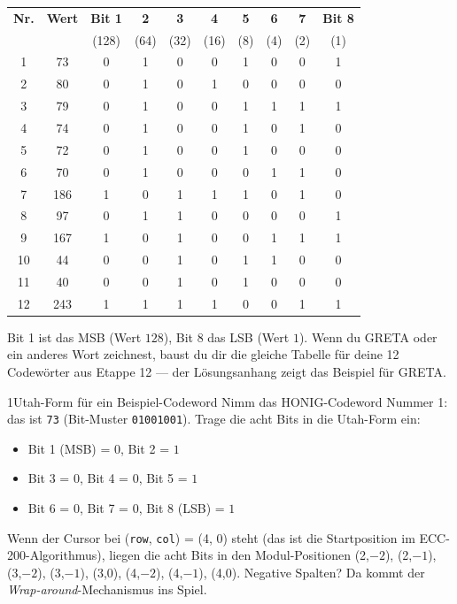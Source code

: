 \begin{center}
\small
\begin{tabular}{c c | c c c c c c c c}
\toprule
\textbf{Nr.} & \textbf{Wert} & \textbf{Bit 1} & \textbf{2} & \textbf{3} & \textbf{4} & \textbf{5} & \textbf{6} & \textbf{7} & \textbf{Bit 8} \\
                &           & (128) & (64) & (32) & (16) & (8) & (4) & (2) & (1) \\
\midrule
\phantom{0}1  &  73 & 0 & 1 & 0 & 0 & 1 & 0 & 0 & 1 \\
\phantom{0}2  &  80 & 0 & 1 & 0 & 1 & 0 & 0 & 0 & 0 \\
\phantom{0}3  &  79 & 0 & 1 & 0 & 0 & 1 & 1 & 1 & 1 \\
\phantom{0}4  &  74 & 0 & 1 & 0 & 0 & 1 & 0 & 1 & 0 \\
\phantom{0}5  &  72 & 0 & 1 & 0 & 0 & 1 & 0 & 0 & 0 \\
\phantom{0}6  &  70 & 0 & 1 & 0 & 0 & 0 & 1 & 1 & 0 \\
\phantom{0}7  & 186 & 1 & 0 & 1 & 1 & 1 & 0 & 1 & 0 \\
\phantom{0}8  &  97 & 0 & 1 & 1 & 0 & 0 & 0 & 0 & 1 \\
\phantom{0}9  & 167 & 1 & 0 & 1 & 0 & 0 & 1 & 1 & 1 \\
10            &  44 & 0 & 0 & 1 & 0 & 1 & 1 & 0 & 0 \\
11            &  40 & 0 & 0 & 1 & 0 & 1 & 0 & 0 & 0 \\
12            & 243 & 1 & 1 & 1 & 1 & 0 & 0 & 1 & 1 \\
\bottomrule
\end{tabular}
\end{center}

Bit 1 ist das MSB (Wert $128$), Bit 8 das LSB (Wert $1$). Wenn du
GRETA oder ein anderes Wort zeichnest, baust du dir die gleiche
Tabelle für deine 12 Codewörter aus Etappe 12 — der Lösungsanhang
zeigt das Beispiel für GRETA.

\begin{bleistiftuebung}{1}{Utah-Form für ein Beispiel-Codeword}
Nimm das HONIG-Codeword Nummer 1: das ist \texttt{73} (Bit-Muster
\texttt{01001001}). Trage die acht Bits in die Utah-Form ein:

\begin{itemize}
\item Bit 1 (MSB) = $0$, Bit 2 = $1$
\item Bit 3 = $0$, Bit 4 = $0$, Bit 5 = $1$
\item Bit 6 = $0$, Bit 7 = $0$, Bit 8 (LSB) = $1$
\end{itemize}

Wenn der Cursor bei (\texttt{row}, \texttt{col}) = (4, 0) steht (das
ist die Startposition im ECC-200-Algorithmus), liegen die acht
Bits in den Modul-Positionen (2,$-2$), (2,$-1$), (3,$-2$), (3,$-1$),
(3,0), (4,$-2$), (4,$-1$), (4,0). Negative Spalten? Da kommt der
\emph{Wrap-around}-Mechanismus ins Spiel.
\end{bleistiftuebung}


